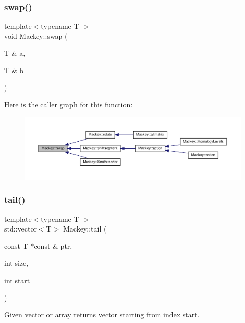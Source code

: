 \subsubsection{\texorpdfstring{swap()}{swap()}}
{\footnotesize\ttfamily template$<$typename T $>$ \\
void Mackey\+::swap (\begin{DoxyParamCaption}\item[{T \&}]{a,  }\item[{T \&}]{b }\end{DoxyParamCaption})}

Here is the caller graph for this function\+:\nopagebreak
\begin{figure}[H]
\begin{center}
\leavevmode
\includegraphics[width=350pt]{namespaceMackey_aabed38680919594c4ba5eaa6730a7f82_icgraph}
\end{center}
\end{figure}
\mbox{\label{namespaceMackey_a1e4b11e9d2a5b70f8380af87cae31ef3}} 
\subsubsection{\texorpdfstring{tail()}{tail()}}
{\footnotesize\ttfamily template$<$typename T $>$ \\
std\+::vector$<$T$>$ Mackey\+::tail (\begin{DoxyParamCaption}\item[{const T $\ast$const \&}]{ptr,  }\item[{int}]{size,  }\item[{int}]{start }\end{DoxyParamCaption})\hspace{0.3cm}{\ttfamily [inline]}}



Given vector or array returns vector starting from index start. 

